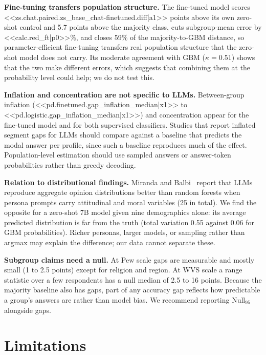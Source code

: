 \documentclass[conference]{IEEEtran}
\begin{document}
\textbf{Fine-tuning transfers population structure.} The fine-tuned model scores <<zs.chat.paired.zs_base_chat-finetuned.diff|a1>> points above its own zero-shot control and 5.7 points above the majority class, cuts subgroup-mean error by <<calc.red_ft|p0>>\%, and closes 59\% of the majority-to-GBM distance, so parameter-efficient fine-tuning transfers real population structure that the zero-shot model does not carry. Its moderate agreement with GBM ($\kappa=0.51$) shows that the two make different errors, which suggests that combining them at the probability level could help; we do not test this.

\textbf{Inflation and concentration are not specific to LLMs.} Between-group inflation (<<pd.finetuned.gap_inflation_median|x1>> to <<pd.logistic.gap_inflation_median|x1>>) and concentration appear for the fine-tuned model and for both supervised classifiers. Studies that report inflated segment gaps for LLMs should compare against a baseline that predicts the modal answer per profile, since such a baseline reproduces much of the effect. Population-level estimation should use sampled answers or answer-token probabilities rather than greedy decoding.

\textbf{Relation to distributional findings.} Miranda and Balbi~\cite{miranda2025} report that LLMs reproduce aggregate opinion distributions better than random forests when persona prompts carry attitudinal and moral variables (25 in total). We find the opposite for a zero-shot 7B model given nine demographics alone: its average predicted distribution is far from the truth (total variation 0.55 against 0.06 for GBM probabilities). Richer personas, larger models, or sampling rather than argmax may explain the difference; our data cannot separate these.

\textbf{Subgroup claims need a null.} At Pew scale gaps are measurable and mostly small (1 to 2.5 points) except for religion and region. At WVS scale a range statistic over a few respondents has a null median of 2.5 to 16 points. Because the majority baseline also has gaps, part of any accuracy gap reflects how predictable a group's answers are rather than model bias. We recommend reporting $\mathrm{Null}_{95}$ alongside gaps.

\section{Limitations}
\end{document}
